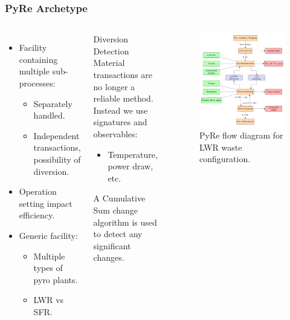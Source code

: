 \begin{frame}
	\frametitle{PyRe Archetype}
	\begin{columns}
		\column[t]{6cm}
		\begin{itemize}
			\item Facility containing multiple sub-processes:
			\begin{itemize}
				\item Separately handled.
				\item Independent transactions, possibility of diversion.
			\end{itemize}
			\item Operation setting impact efficiency.
			\item Generic facility:
			\begin{itemize}
				\item Multiple types of pyro plants.
				\item LWR vs SFR.
			\end{itemize}
		\end{itemize}
		\begin{block}{Diversion Detection}
			Material transactions are no longer a reliable method. Instead we use
			signatures and observables:
			\begin{itemize}
				\item Temperature, power draw, etc.
			\end{itemize}
			A Cumulative Sum change algorithm is used to detect any significant changes.
		\end{block}
		\column[t]{5cm}
		\begin{figure}
			\includegraphics[width=\linewidth]{./images/westphal-pyre.pdf}
			\caption{PyRe flow diagram for LWR waste configuration.}
			\label{fig:pyre}
		\end{figure}
	\end{columns}
\end{frame}